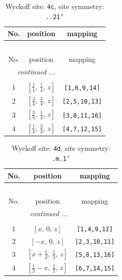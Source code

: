 \documentclass[fleqn,8pt]{jsarticle}
\begin{document}
\renewcommand{\arraystretch}{1.2}
\begin{longtable}{ccc}
\caption{Wyckoff site: {\tt 4c}, site symmetry: {\tt ..21'}}
 \\
 \hline \hline
No. & position & mapping \\ \hline \endfirsthead

\multicolumn{2}{l}{\tablename\ \thetable{}} \\
 \hline \hline
No. & position & mapping \\ \hline \endhead

 \hline \hline
\multicolumn{2}{r}{\footnotesize\it continued ...} \\ \endfoot

 \hline \hline
\multicolumn{2}{r}{} \\ \endlastfoot

1 & $\left[ \frac{1}{4},\, \frac{1}{4},\, z \right]$ & {\tt [1,6,9,14]} \\ \hline
2 & $\left[ \frac{3}{4},\, \frac{3}{4},\, z \right]$ & {\tt [2,5,10,13]} \\ \hline
3 & $\left[ \frac{3}{4},\, \frac{1}{4},\, z \right]$ & {\tt [3,8,11,16]} \\ \hline
4 & $\left[ \frac{1}{4},\, \frac{3}{4},\, z \right]$ & {\tt [4,7,12,15]} \\
\end{longtable}
\renewcommand{\arraystretch}{1.2}
\begin{longtable}{ccc}
\caption{Wyckoff site: {\tt 4d}, site symmetry: {\tt .m.1'}}
 \\
 \hline \hline
No. & position & mapping \\ \hline \endfirsthead

\multicolumn{2}{l}{\tablename\ \thetable{}} \\
 \hline \hline
No. & position & mapping \\ \hline \endhead

 \hline \hline
\multicolumn{2}{r}{\footnotesize\it continued ...} \\ \endfoot

 \hline \hline
\multicolumn{2}{r}{} \\ \endlastfoot

1 & $\left[ x,\, 0,\, z \right]$ & {\tt [1,4,9,12]} \\ \hline
2 & $\left[ - x,\, 0,\, z \right]$ & {\tt [2,3,10,11]} \\ \hline
3 & $\left[ x + \frac{1}{2},\, \frac{1}{2},\, z \right]$ & {\tt [5,8,13,16]} \\ \hline
4 & $\left[ \frac{1}{2} - x,\, \frac{1}{2},\, z \right]$ & {\tt [6,7,14,15]} \\
\end{longtable}
\end{document}
